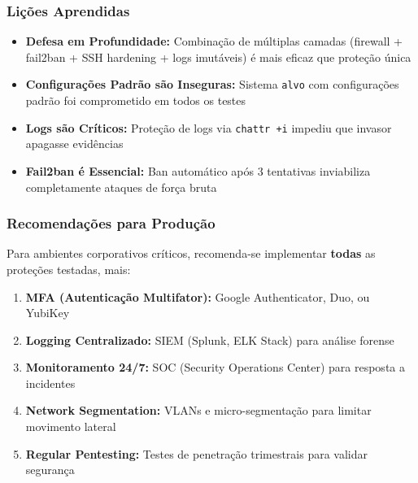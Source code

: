\documentclass[12pt]{article}
\begin{document}
\subsubsection{Lições Aprendidas}

\begin{itemize}
    \item \textbf{Defesa em Profundidade:} Combinação de múltiplas camadas (firewall + fail2ban + SSH hardening + logs imutáveis) é mais eficaz que proteção única
    \item \textbf{Configurações Padrão são Inseguras:} Sistema \texttt{alvo} com configurações padrão foi comprometido em todos os testes
    \item \textbf{Logs são Críticos:} Proteção de logs via \texttt{chattr +i} impediu que invasor apagasse evidências
    \item \textbf{Fail2ban é Essencial:} Ban automático após 3 tentativas inviabiliza completamente ataques de força bruta
\end{itemize}

\subsubsection{Recomendações para Produção}

Para ambientes corporativos críticos, recomenda-se implementar \textbf{todas} as proteções testadas, mais:
\begin{enumerate}
    \item \textbf{MFA (Autenticação Multifator):} Google Authenticator, Duo, ou YubiKey
    \item \textbf{Logging Centralizado:} SIEM (Splunk, ELK Stack) para análise forense
    \item \textbf{Monitoramento 24/7:} SOC (Security Operations Center) para resposta a incidentes
    \item \textbf{Network Segmentation:} VLANs e micro-segmentação para limitar movimento lateral
    \item \textbf{Regular Pentesting:} Testes de penetração trimestrais para validar segurança
\end{enumerate}
\end{document}
